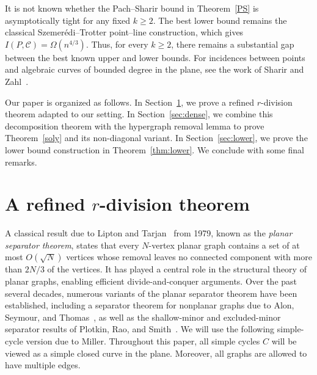 \documentclass[11pt]{article}
\theoremstyle{plain}
\theoremstyle{definition}
\theoremstyle{remark}
\begin{document}
It is not known whether the Pach--Sharir bound in Theorem~\ref{PS} is asymptotically tight for any fixed \(k\ge2\). The best lower bound remains the classical Szemer\'edi--Trotter point--line construction, which gives \(I(P,\mathcal C)=\Omega(n^{4/3})\). Thus, for every \(k\ge2\), there remains a substantial gap between the best known upper and lower bounds.  For incidences between points and algebraic curves of bounded degree in the plane, see the work of Sharir and Zahl~\cite{ShZ}.



Our paper is organized as follows. In Section~\ref{sec:rdiv}, we prove a refined \(r\)-division theorem adapted to our setting. In Section~\ref{sec:dense}, we combine this decomposition theorem with the hypergraph removal lemma to prove Theorem~\ref{soly} and its non-diagonal variant. In Section~\ref{sec:lower}, we prove the lower bound construction in Theorem~\ref{thm:lower}.  We conclude with some final remarks.















\section{A refined $r$-division theorem}\label{sec:rdiv}






A classical result due to Lipton and Tarjan~\cite{LiptonTarjan1979} from 1979, known as the \emph{planar separator theorem}, states that every $N$-vertex planar graph contains a set of at most $O(\sqrt{N})$ vertices whose removal leaves no connected component with more than $2N/3$ of the vertices.
It has played a central role in the structural theory of planar graphs, enabling efficient divide-and-conquer arguments.
Over the past several decades, numerous variants of the planar separator theorem have been established, including a separator theorem for nonplanar graphs due to Alon, Seymour, and Thomas~\cite{AlonSeymourThomas1990}, as well as the shallow-minor and excluded-minor separator results of Plotkin, Rao, and Smith~\cite{PlotkinRaoSmith1994}.
We will use the following simple-cycle version due to Miller.  Throughout this paper, all simple cycles $C$ will be viewed as a simple closed curve in the plane.  Moreover, all graphs are allowed to have multiple edges.
\end{document}
